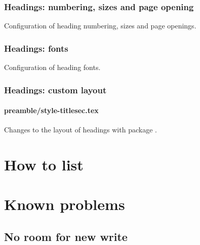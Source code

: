 \subsection{Headings: numbering, sizes and page opening}

Configuration of heading numbering, sizes and page openings.


\subsection{Headings: fonts}

Configuration of heading fonts.


\subsection{Headings: custom layout}


\subsubsection{preamble/style-titlesec.tex}

Changes to the layout of headings with package . 



\chapter{How to list}

\chapter{Known problems}

\section{No room for new write}
\label{sec:problems:write}